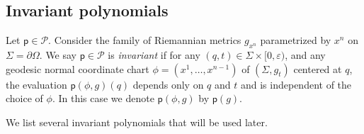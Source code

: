 \documentclass[11pt]{amsart}
\theoremstyle{definition}
\numberwithin{equation}{section}
\begin{document}
\subsection{Invariant polynomials}\label{subsec: exp of inv poly}
 
Let $\mathsf p\in\mathcal P$. 
Consider the family of Riemannian metrics $g_{x^n}$ parametrized by $x^n$ on $\Sigma=\partial \Omega$.
We say  $\mathsf p\in\mathcal P$ is {\em invariant} if for any $(q,t) \in \Sigma \times [0,\varepsilon)$, and  any geodesic normal coordinate chart $\phi=(x^1,\dots,x^{n-1})$  of $(\Sigma, g_{t})$ centered at $q$, the evaluation $\mathsf p(\phi,g)(q)$ depends only on $q$ and $t$ and is independent of the choice of $\phi$. In this case we denote $\mathsf p(\phi,g)$ by $\mathsf p(g)$. 


We list several invariant polynomials that will be used later.
\end{document}
